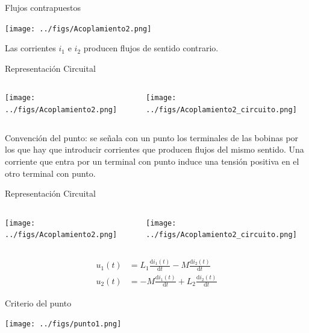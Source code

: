 \documentclass[xcolor={usenames,svgnames,dvipsnames}]{beamer}
\begin{document}
\begin{frame}[label={sec:org23401c7}]{Flujos contrapuestos}
\begin{center}
\texttt{[image: ../figs/Acoplamiento2.png]}
\end{center}

Las corrientes \(i_1\) e \(i_2\) producen flujos de sentido contrario.
\end{frame}
\begin{frame}[label={sec:orgcafe3e8}]{Representación Circuital}
\begin{columns}
\begin{column}{0.5\columnwidth}
\begin{center}
\texttt{[image: ../figs/Acoplamiento2.png]}
\end{center}
\end{column}

\begin{column}{0.5\columnwidth}
\begin{center}
\texttt{[image: ../figs/Acoplamiento2\_circuito.png]}
\end{center}
\end{column}
\end{columns}
\alert{Convención del punto}: se señala con un punto los terminales de las
bobinas por los que hay que introducir corrientes que producen flujos
del mismo sentido. Una corriente que entra por un terminal con punto
induce una tensión positiva en el otro terminal con punto.
\end{frame}
\begin{frame}[label={sec:org8f01d7a}]{Representación Circuital}
\begin{columns}
\begin{column}{0.5\columnwidth}
\begin{center}
\texttt{[image: ../figs/Acoplamiento2.png]}
\end{center}
\end{column}

\begin{column}{0.5\columnwidth}
\begin{center}
\texttt{[image: ../figs/Acoplamiento2\_circuito.png]}
\end{center}
\end{column}
\end{columns}
\begin{align*}
  u_1(t) &= L_1 \frac{\mathrm{d}i_1(t)}{\mathrm{d}t} - M \frac{\mathrm{d}i_2(t)}{\mathrm{d}t}\\
  u_2(t) &= - M \frac{\mathrm{d}i_1(t)}{\mathrm{d}t} + L_2 \frac{\mathrm{d}i_2(t)}{\mathrm{d}t}
\end{align*}
\end{frame}
\begin{frame}[label={sec:orgfdb5351}]{Criterio del punto}
\begin{center}
\texttt{[image: ../figs/punto1.png]}
\end{center}
\end{frame}
\end{document}
